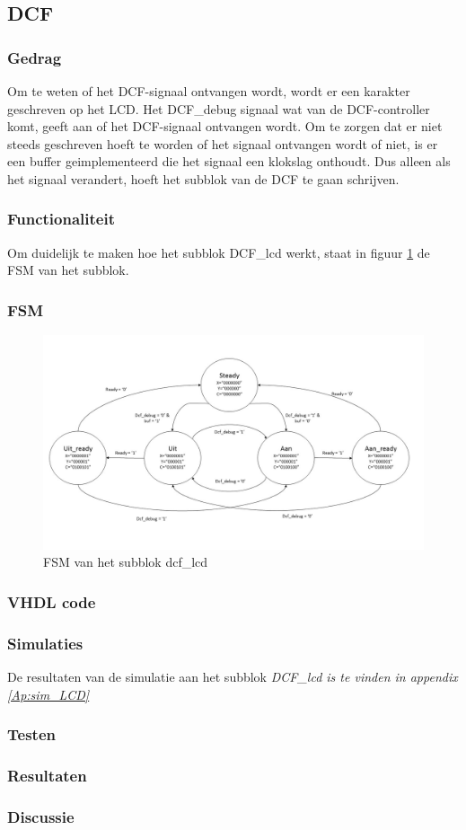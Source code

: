 \subsection{DCF}

\subsubsection{Gedrag}
Om te weten of het DCF-signaal ontvangen wordt, wordt er een karakter geschreven op het LCD. Het DCF\_debug signaal wat van de DCF-controller komt, geeft aan of het DCF-signaal ontvangen wordt. Om te zorgen dat er niet steeds geschreven hoeft te worden of het signaal ontvangen wordt of niet, is er een buffer geimplementeerd die het signaal een klokslag onthoudt. Dus alleen als het signaal verandert, hoeft het subblok van de DCF te gaan schrijven.

\subsubsection{Functionaliteit}
Om duidelijk te maken hoe het subblok DCF\_lcd werkt, staat in figuur \ref{fig:FSMdcf} de FSM van het subblok.

\subsubsection{FSM}

\begin{figure}[h!]
\includegraphics[width=15cm]{verslagschemas/FSMs/FSMdcf}
\caption{FSM van het subblok dcf\_lcd}
\label{fig:FSMdcf}
\end{figure}

\subsubsection{VHDL code}

\subsubsection{Simulaties}
De resultaten van de simulatie aan het subblok \it{DCF\_lcd} is te vinden in appendix \ref{Ap:sim_LCD}

\subsubsection{Testen}

\subsubsection{Resultaten}

\subsubsection{Discussie}